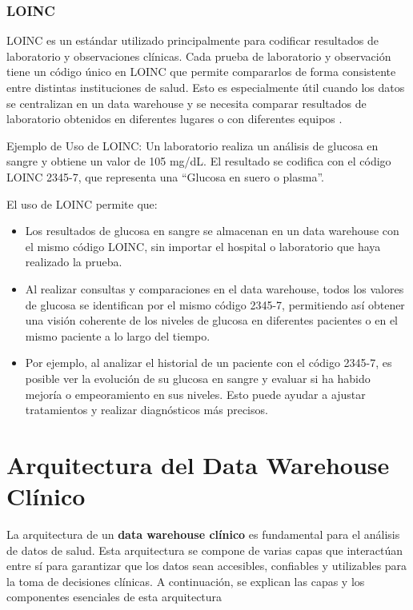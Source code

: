 \documentclass[12pt, a4paper, twoside]{article}
\begin{document}
	\subsubsection{LOINC}
	
	LOINC es un estándar utilizado principalmente para codificar resultados de laboratorio y observaciones clínicas. Cada prueba de laboratorio y observación tiene un código único en LOINC que permite compararlos de forma consistente entre distintas instituciones de salud. Esto es especialmente útil cuando los datos se centralizan en un data warehouse y se necesita comparar resultados de laboratorio obtenidos en diferentes lugares o con diferentes equipos \cite{meditecsInteroperabilidad}.
	
	Ejemplo de Uso de LOINC: Un laboratorio realiza un análisis de glucosa en sangre y obtiene un valor de 105 mg/dL. El resultado se codifica con el código LOINC 2345-7, que representa una “Glucosa en suero o plasma”\cite{loinc2345}.
	
	
	El uso de LOINC permite que:
	\begin{itemize}
		\item Los resultados de glucosa en sangre se almacenan en un data warehouse con el mismo código LOINC, sin importar el hospital o laboratorio que haya realizado la prueba.
		
		\item Al realizar consultas y comparaciones en el data warehouse, todos los valores de glucosa se identifican por el mismo código 2345-7, permitiendo así obtener una visión coherente de los niveles de glucosa en diferentes pacientes o en el mismo paciente a lo largo del tiempo.
		
		\item Por ejemplo, al analizar el historial de un paciente con el código 2345-7, es posible ver la evolución de su glucosa en sangre y evaluar si ha habido mejoría o empeoramiento en sus niveles. Esto puede ayudar a ajustar tratamientos y realizar diagnósticos más precisos.
	\end{itemize}
	
	
	
	\section{Arquitectura del Data Warehouse Clínico}
	
	La arquitectura de un \textbf{data warehouse clínico} es fundamental para el análisis de datos de salud. Esta arquitectura se compone de varias capas que interactúan entre sí para garantizar que los datos sean accesibles, confiables y utilizables para la toma de decisiones clínicas. A continuación, se explican las capas y los componentes esenciales de esta arquitectura
	
\end{document}
